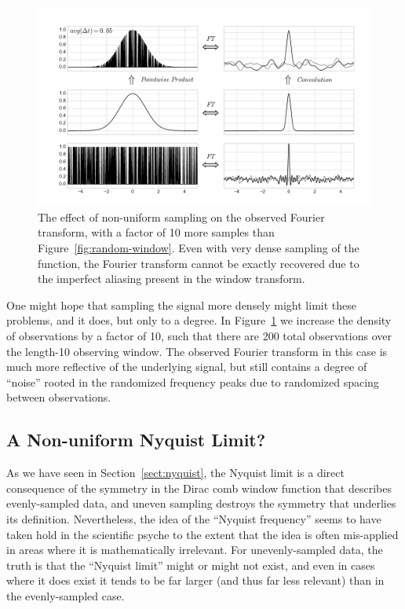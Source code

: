 \documentclass[preprint]{aastex}
\newcommand{\Fig}[1]{Figure~\ref{fig:#1}}
\newcommand{\fig}[1]{Figure~\ref{fig:#1}}
\newcommand{\figlabel}[1]{\label{fig:#1}}
\newcommand{\Sect}[1]{Section~\ref{sect:#1}}
\newcommand{\sect}[1]{\Sect{#1}}
\newcommand{\sectlabel}[1]{\label{sect:#1}}
\begin{document}
\begin{figure}[ht]
  \centering
  \includegraphics[width=\textwidth]{fig11_random_window_2}
  \caption{The effect of non-uniform sampling on the observed Fourier transform,
    with a factor of 10 more samples than \fig{random-window}.
    Even with very dense sampling of the function, the Fourier transform
    cannot be exactly recovered due to the imperfect aliasing present in
    the window transform.
    \figlabel{random-window-2}}
\end{figure}

One might hope that sampling the signal more densely might limit these problems,
and it does, but only to a degree.
In \Fig{random-window-2} we increase the density of observations by a factor of 10,
such that there are 200 total observations over the length-10 observing window.
The observed Fourier transform in this case is much more reflective of the
underlying signal, but still contains a degree of ``noise'' rooted in the
randomized frequency peaks due to randomized spacing between observations.

\subsection{A Non-uniform Nyquist Limit?}
\sectlabel{pseudo-nyquist}

As we have seen in \sect{nyquist}, the Nyquist limit is a direct consequence
of the symmetry in the Dirac comb window function that describes evenly-sampled data,
and uneven sampling destroys the symmetry that underlies its definition.
Nevertheless, the idea of the ``Nyquist frequency'' seems to have taken hold
in the scientific psyche to the extent that the idea is often mis-applied in
areas where it is mathematically irrelevant.
For unevenly-sampled data, the truth is that the ``Nyquist limit'' might or
might not exist, and even in cases where it does exist it tends to be far
larger (and thus far less relevant) than in the evenly-sampled case.
\end{document}
